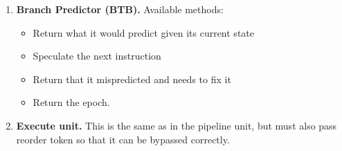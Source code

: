 \documentclass[12pt]{article}
\begin{document}
\begin{enumerate}
    \item \textbf{Branch Predictor (BTB).} Available methods:
        \begin{itemize}
            \item[] Return what it would predict given its current state
            \item[] Speculate the next instruction
            \item[] Return that it mispredicted and needs to fix it
            \item[] Return the epoch.
        \end{itemize}

    \item \textbf{Execute unit.} This is the same as in the pipeline unit, but must also pass reorder token so that it can be bypassed correctly.
\end{enumerate}

 
\end{document}
